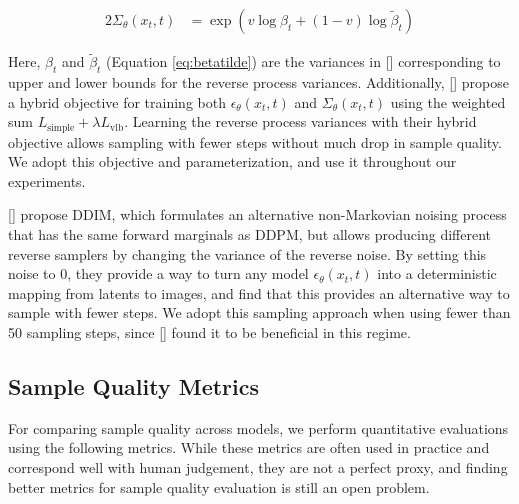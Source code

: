 \begin{alignat}{2}
    \Sigma_{\theta}(x_t,t) &= \exp(v \log \beta_t + (1-v) \log \tilde{\beta}_t) \label{eq:learnedsigma}
\end{alignat}

Here, $\beta_t$ and $\tilde{\beta}_t$ (Equation \ref{eq:betatilde}) are the variances in \citeauthor{ddpm} [] corresponding to upper and lower bounds for the reverse process variances. Additionally, \citeauthor{improved} [] propose a hybrid objective for training both $\epsilon_{\theta}(x_t,t)$ and $\Sigma_{\theta}(x_t,t)$ using the weighted sum $L_{\text{simple}} + \lambda L_{\text{vlb}}$. Learning the reverse process variances with their hybrid objective allows sampling with fewer steps without much drop in sample quality. We adopt this objective and parameterization, and use it throughout our experiments.

\citeauthor{ddim} [] propose DDIM, which formulates an alternative non-Markovian noising process that has the same forward marginals as DDPM, but allows producing different reverse samplers by changing the variance of the reverse noise. By setting this noise to 0, they provide a way to turn any model $\epsilon_{\theta}(x_t,t)$ into a deterministic mapping from latents to images, and find that this provides an alternative way to sample with fewer steps. We adopt this sampling approach when using fewer than 50 sampling steps, since \citeauthor{improved} [] found it to be beneficial in this regime.

\subsection{Sample Quality Metrics}

For comparing sample quality across models, we perform quantitative evaluations using the following metrics. While these metrics are often used in practice and correspond well with human judgement, they are not a perfect proxy, and finding better metrics for sample quality evaluation is still an open problem.

